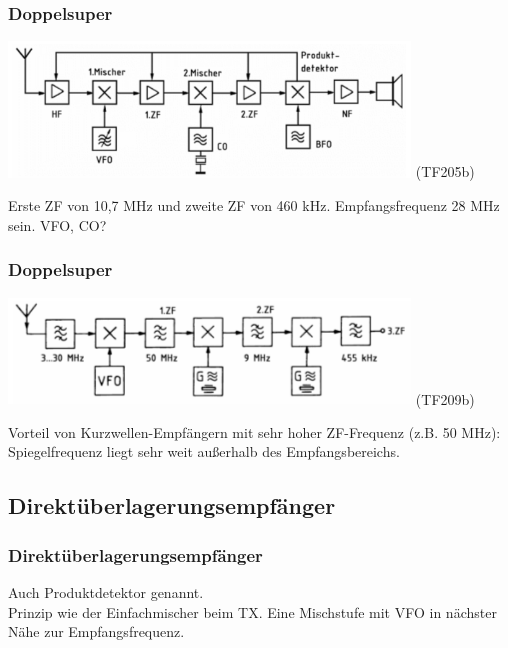 \begin{frame}
    \frametitle{Doppelsuper}

    \begin{center}
        \includegraphics[width=0.8\textwidth]{a13/TF205b.png}
        \tiny (TF205b)
    \end{center}

    Erste ZF von 10,7 MHz und zweite ZF von 460 kHz. Empfangsfrequenz 28 MHz
    sein. VFO, CO?
    


\end{frame}

\begin{frame}
    \frametitle{Doppelsuper}

    \begin{center}
        \includegraphics[width=0.8\textwidth]{a13/TF209b.png}
        \tiny (TF209b)
    \end{center}

    Vorteil von Kurzwellen-Empfängern mit sehr hoher ZF-Frequenz (z.B. 50 MHz):
    Spiegelfrequenz liegt sehr weit außerhalb des Empfangsbereichs.

\end{frame}


\subsection{Direktüberlagerungsempfänger}

\begin{frame}
    \frametitle{Direktüberlagerungsempfänger}

    Auch Produktdetektor genannt. \\[2em]

    Prinzip wie der Einfachmischer beim TX. Eine Mischstufe mit VFO in nächster
    Nähe zur Empfangsfrequenz.

\end{frame}

